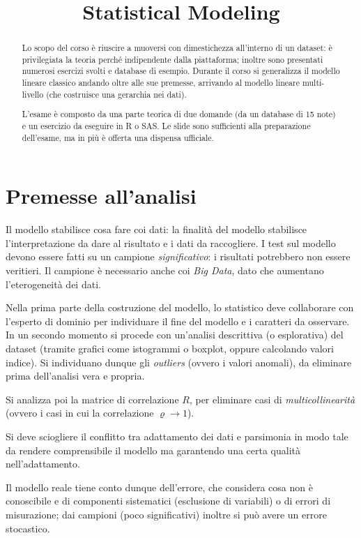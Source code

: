 \documentclass[11pt, twocolumn]{article}
\title{\textbf{Statistical Modeling}}
\author{}
\date{}
\begin{document}
\maketitle
\begin{abstract}
  Lo scopo del corso è riuscire a muoversi con dimestichezza all'interno di un dataset: è privilegiata la teoria perché indipendente dalla piattaforma; inoltre sono presentati numerosi esercizi svolti e database di esempio.
  Durante il corso si generalizza il modello lineare classico andando oltre alle sue premesse, arrivando al modello lineare multi-livello (che costruisce una gerarchia nei dati).

  L'esame è composto da una parte teorica di due domande (da un database di 15 note) e un esercizio da eseguire in R o SAS.
  Le slide sono sufficienti alla preparazione dell'esame, ma in più è offerta una dispensa ufficiale.
\end{abstract}

\newpage
\part{Premesse all'analisi}
Il modello stabilisce cosa fare coi dati: la finalità del modello stabilisce l'interpretazione da dare al risultato e i dati da raccogliere.
I test sul modello devono essere fatti su un campione \textit{significativo}: i risultati potrebbero non essere veritieri.
Il campione è necessario anche coi \textit{Big Data}, dato che aumentano l'eterogeneità dei dati.

Nella prima parte della costruzione del modello, lo statistico deve collaborare con l'esperto di dominio per individuare il fine del modello e i caratteri da osservare.
In un secondo momento si procede con un'analisi descrittiva (o esplorativa) del dataset (tramite grafici come istogrammi o boxplot, oppure calcolando valori indice).
Si individuano dunque gli \textit{outliers} (ovvero i valori anomali), da eliminare prima dell'analisi vera e propria.

Si analizza poi la matrice di correlazione $R$, per eliminare casi di \textit{multicollinearità} (ovvero i casi in cui la correlazione $\varrho \to 1$).

Si deve sciogliere il conflitto tra adattamento dei dati e parsimonia in modo tale da rendere comprensibile il modello ma garantendo una certa qualità nell'adattamento.

Il modello reale tiene conto dunque dell'errore, che considera cosa non è conoscibile e di componenti sistematici (esclusione di variabili) o di errori di misurazione; dai campioni (poco significativi) inoltre si può avere un errore stocastico.
\end{document}
